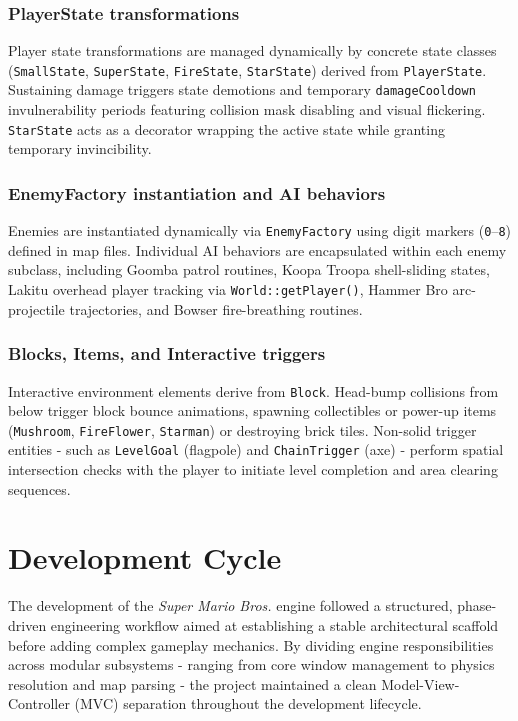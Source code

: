 \documentclass[12pt, a4paper]{article}
\begin{document}
\subsubsection{PlayerState transformations}
Player state transformations are managed dynamically by concrete state classes (\texttt{SmallState}, \texttt{SuperState}, \texttt{FireState}, \texttt{StarState}) derived from \texttt{PlayerState}. Sustaining damage triggers state demotions and temporary \texttt{damageCooldown} invulnerability periods featuring collision mask disabling and visual flickering. \texttt{StarState} acts as a decorator wrapping the active state while granting temporary invincibility.

\subsubsection{EnemyFactory instantiation and AI behaviors}
Enemies are instantiated dynamically via \texttt{EnemyFactory} using digit markers (\texttt{0}--\texttt{8}) defined in map files. Individual AI behaviors are encapsulated within each enemy subclass, including Goomba patrol routines, Koopa Troopa shell-sliding states, Lakitu overhead player tracking via \texttt{World::getPlayer()}, Hammer Bro arc-projectile trajectories, and Bowser fire-breathing routines.

\subsubsection{Blocks, Items, and Interactive triggers}
Interactive environment elements derive from \texttt{Block}. Head-bump collisions from below trigger block bounce animations, spawning collectibles or power-up items (\texttt{Mushroom}, \texttt{FireFlower}, \texttt{Starman}) or destroying brick tiles. Non-solid trigger entities - such as \texttt{LevelGoal} (flagpole) and \texttt{ChainTrigger} (axe) - perform spatial intersection checks with the player to initiate level completion and area clearing sequences.

\newpage

\section{Development Cycle}

The development of the \textit{Super Mario Bros.} engine followed a structured, phase-driven engineering workflow aimed at establishing a stable architectural scaffold before adding complex gameplay mechanics. By dividing engine responsibilities across modular subsystems - ranging from core window management to physics resolution and map parsing - the project maintained a clean Model-View-Controller (MVC) separation throughout the development lifecycle.
\end{document}
